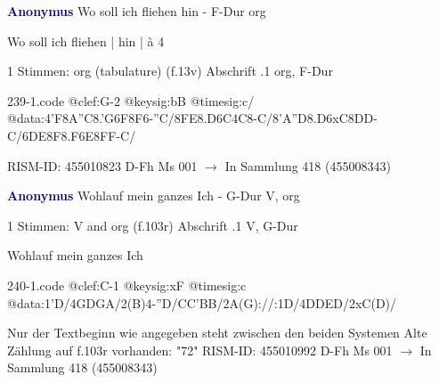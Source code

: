 \documentclass[twocolumn]{book}
\begin{document}
\newline \par \vspace{7pt} \textcolor{darkblue}{\textbf{Anonymus  }}
\newline Wo soll ich fliehen hin - F-Dur
\newline org
\newline \begin{itshape}[f.13v, at left:] Wo soll ich fliehen | hin | à 4\end{itshape} 
\newline \textcolor{darkblue}{}  1 Stimmen: org (tabulature)  (f.13v)
\newline Abschrift
.1  org, F-Dur  
\begin{filecontents*}{239-1.code}
@clef:G-2
@keysig:bB
@timesig:c/
@data:4'F{8A''C}{8.'G6F}8F6-''C/{8FE8.D6C}4C8-C/{8'A''D8.D6xC}{8DD}-C/{6DE8F8.F6E}{8FF}-C/
\end{filecontents*}
\newline
%
\newline RISM-ID: 455010823
\newline D-Fh  Ms 001
\newline $\rightarrow$ In Sammlung 418 (455008343)
      
\newline \par \vspace{7pt} \textcolor{darkblue}{\textbf{Anonymus  }}
\newline Wohlauf mein ganzes Ich - G-Dur
\newline V, org
\newline \begin{itshape}\end{itshape} 
\newline \textcolor{darkblue}{}  1 Stimmen: V and org  (f.103r)
\newline Abschrift
.1  V, G-Dur
\newline \begin{footnotesize} Wohlauf mein ganzes Ich \end{footnotesize}  
\begin{filecontents*}{240-1.code}
@clef:C-1
@keysig:xF
@timesig:c
@data:1'D/4GDGA/2(B)4-''D/CC'BB/2A(G)://:1D/4DDED/2xC(D)/
\end{filecontents*}
\newline
%
\newline Nur der Textbeginn wie angegeben steht zwischen den beiden Systemen
\newline Alte Zählung auf f.103r vorhanden: "72"
\newline RISM-ID: 455010992
\newline D-Fh  Ms 001
\newline $\rightarrow$ In Sammlung 418 (455008343)
      
\end{document}
